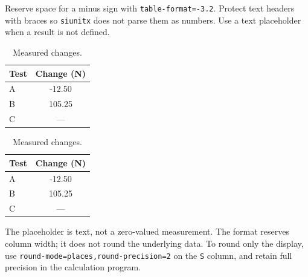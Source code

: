 Reserve space for a minus sign with \texttt{table-format=-3.2}.
Protect text headers with braces so \texttt{siunitx} does not parse them
as numbers. Use a text placeholder when a result is not defined.
\begin{referencecode}
\begin{table}[htbp]
    \centering
    \caption{Measured changes.}
    \begin{tabular}{l S[table-format=-3.2]}
        \toprule
        Test & {Change (\unit{\newton})} \\
        \midrule
        A & -12.50 \\
        B & 105.25 \\
        C & {---} \\
        \bottomrule
    \end{tabular}
\end{table}
\end{referencecode}

\begin{table}[H]
    \centering
    \caption{Measured changes.}
    \begin{tabular}{l S[table-format=-3.2]}
        \toprule
        Test & {Change (\unit{\newton})} \\
        \midrule
        A & -12.50 \\
        B & 105.25 \\
        C & {---} \\
        \bottomrule
    \end{tabular}
\end{table}
The placeholder is text, not a zero-valued measurement. The format reserves
column width; it does not round the underlying data. To round only the
display, use \texttt{round-mode=places,round-precision=2} on the
\texttt{S} column, and retain full precision in the calculation program.
